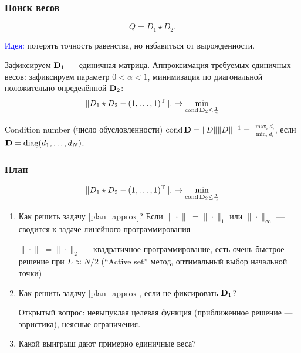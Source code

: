 \documentclass[unicode, notheorems]{beamer}
\DeclareMathOperator{\cond}{cond}
\begin{document}
\begin{frame}
	\frametitle{Поиск весов}
	\begin{equation*}
	Q = D_1 \star D_2.
	\end{equation*}
	
	\textcolor{blue}{Идея:} потерять точность равенства, но избавиться от вырожденности. 
	
	Зафиксируем $\mathbf{D}_1$ --- единичная матрица. Аппроксимация требуемых единичных весов: зафиксируем параметр $0 < \alpha < 1$, минимизация по диагональной положительно определённой $\mathbf{D}_2$:
	\begin{equation*}
	\|D_1 \star D_2 - (1, \ldots, 1)^\rmT\|_\cdot \to \min_{\cond \bfD_2 \le \frac{1}{\alpha}}
	\end{equation*}
	
	\vspace{0.2cm}
	Condition number (число обусловленности) $\cond \bfD = \|D\| \|D\|^{-1} = $ $\frac{\max_i d_i}{\min_i d_i}$, если $\mathbf{D} = \text{diag}(d_1, \ldots, d_N)$.
\end{frame}

\begin{frame}
	\frametitle{План}
	\begin{equation}\label{plan_approx}
	\|D_1 \star D_2 - (1, \ldots, 1)^\rmT\|_\cdot \to \min_{\cond \bfD_2 \le \frac{1}{\alpha}}
	\end{equation}
	
	\begin{enumerate}
		\item Как решить задачу \eqref{plan_approx}?
		Если $\|\cdot\|_\cdot = \|\cdot\|_1$ или $\|\cdot\|_\infty$ --- сводится к задаче линейного программирования
		
		$\|\cdot\|_\cdot = \|\cdot\|_2$ --- квадратичное программирование, есть очень быстрое решение при $L \approx N/2$ (``Active set'' метод, оптимальный выбор начальной точки)
		\pause
		\item Как решить задачу \eqref{plan_approx}, если не фиксировать $\mathbf{D}_1$?
		
		Открытый вопрос: невыпуклая целевая функция (приближенное решение --- эвристика), неясные ограничения.
		\pause
		\item Какой выигрыш дают примерно единичные веса?
	\end{enumerate}
	
\end{frame}
\end{document}
